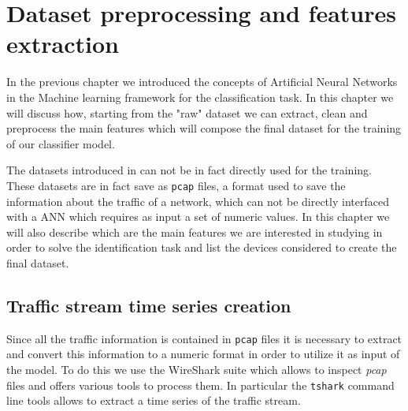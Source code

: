 \chapter{Dataset preprocessing and features extraction}\label{chap4}

In the previous chapter we introduced the concepts of Artificial Neural Networks in the Machine learning framework for the classification task. In this chapter we will discuss how, starting from the "raw" dataset we can extract, clean and preprocess the main features which will compose the final dataset for the training of our classifier model.

The datasets introduced in  can not be in fact directly used for the training. These datasets are in fact save as \texttt{pcap} files, a format used to save the information about the traffic of a network, which can not be directly interfaced with a ANN which requires as input a set of numeric values. In this chapter we will also describe which are the main features we are interested in studying in order to solve the identification task and list the devices considered to create the final dataset.

\section{Traffic stream time series creation}

Since all the traffic information is contained in \texttt{pcap} files it is necessary to extract and convert this information to a numeric format in order to utilize it as input of the model.
To do this we use the WireShark suite which allows to inspect \textit{pcap} files and offers various tools to process them. In particular the \texttt{tshark} command line tools allows to extract a time series of the traffic stream.

